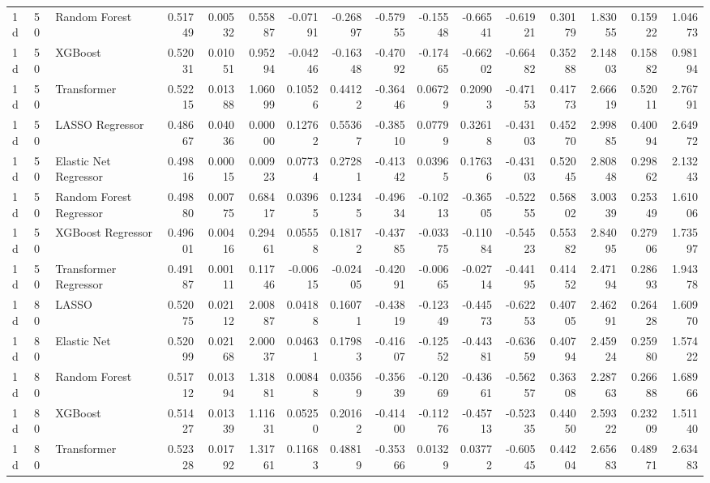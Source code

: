 \begin{tabular}{lllrrrrrrrrrrrrr}
1d & 50 & Random Forest & 0.51749 & 0.00532 & 0.55887 & -0.07191 & -0.26897 & -0.57955 & -0.15548 & -0.66541 & -0.61921 & 0.30179 & 1.83055 & 0.15922 & 1.04673 \\
1d & 50 & XGBoost & 0.52031 & 0.01051 & 0.95294 & -0.04246 & -0.16348 & -0.47092 & -0.17465 & -0.66202 & -0.66482 & 0.35288 & 2.14803 & 0.15882 & 0.98194 \\
1d & 50 & Transformer & 0.52215 & 0.01388 & 1.06099 & 0.10526 & 0.44122 & -0.36446 & 0.06729 & 0.20903 & -0.47153 & 0.41773 & 2.66619 & 0.52011 & 2.76791 \\
1d & 50 & LASSO Regressor & 0.48667 & 0.04036 & 0.00000 & 0.12762 & 0.55367 & -0.38510 & 0.07799 & 0.32618 & -0.43103 & 0.45270 & 2.99885 & 0.40094 & 2.64972 \\
1d & 50 & Elastic Net Regressor & 0.49816 & 0.00015 & 0.00923 & 0.07734 & 0.27281 & -0.41342 & 0.03965 & 0.17636 & -0.43103 & 0.52045 & 2.80848 & 0.29862 & 2.13243 \\
1d & 50 & Random Forest Regressor & 0.49880 & 0.00775 & 0.68417 & 0.03965 & 0.12345 & -0.49634 & -0.10213 & -0.36505 & -0.52255 & 0.56802 & 3.00339 & 0.25349 & 1.61006 \\
1d & 50 & XGBoost Regressor & 0.49601 & 0.00416 & 0.29461 & 0.05558 & 0.18172 & -0.43785 & -0.03375 & -0.11084 & -0.54523 & 0.55382 & 2.84095 & 0.27906 & 1.73597 \\
1d & 50 & Transformer Regressor & 0.49187 & 0.00111 & 0.11746 & -0.00615 & -0.02405 & -0.42091 & -0.00665 & -0.02714 & -0.44195 & 0.41452 & 2.47194 & 0.28693 & 1.94378 \\
1d & 80 & LASSO & 0.52075 & 0.02112 & 2.00887 & 0.04188 & 0.16071 & -0.43819 & -0.12349 & -0.44573 & -0.62253 & 0.40705 & 2.46291 & 0.26428 & 1.60970 \\
1d & 80 & Elastic Net & 0.52099 & 0.02168 & 2.00037 & 0.04631 & 0.17983 & -0.41607 & -0.12552 & -0.44381 & -0.63659 & 0.40794 & 2.45924 & 0.25980 & 1.57422 \\
1d & 80 & Random Forest & 0.51712 & 0.01394 & 1.31881 & 0.00848 & 0.03569 & -0.35639 & -0.12069 & -0.43661 & -0.56257 & 0.36308 & 2.28763 & 0.26688 & 1.68966 \\
1d & 80 & XGBoost & 0.51427 & 0.01339 & 1.11631 & 0.05250 & 0.20162 & -0.41400 & -0.11276 & -0.45713 & -0.52335 & 0.44050 & 2.59322 & 0.23209 & 1.51140 \\
1d & 80 & Transformer & 0.52328 & 0.01792 & 1.31761 & 0.11683 & 0.48819 & -0.35366 & 0.01329 & 0.03772 & -0.60545 & 0.44204 & 2.65683 & 0.48971 & 2.63483 \\

\end{tabular}
